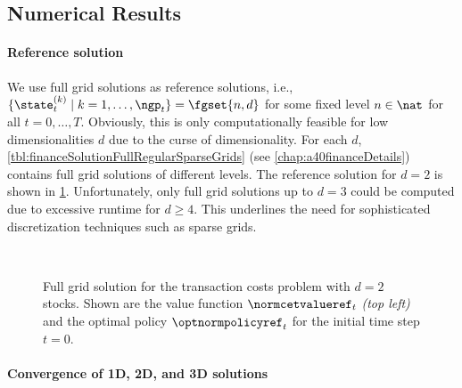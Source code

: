 \subsection{Numerical Results}
\label{sec:843results}

\paragraph{Reference solution}

We use full grid solutions as reference solutions,
i.e., $\{\state_t^{(k)} \mid k = 1, \dotsc, \ngp_t\} = \fgset{n,d}$
for some fixed level $n \in \nat$ for all $t = 0, \dotsc, T$.
Obviously, this is only computationally feasible
for low dimensionalities $d$ due to the curse of dimensionality.
For each $d$,
\cref{tbl:financeSolutionFullRegularSparseGrids}
(see \cref{chap:a40financeDetails})
contains full grid solutions of different levels.
The reference solution for $d = 2$ is shown in
\cref{fig:financeSolution2DReference}.
Unfortunately, only full grid solutions up to $d = 3$ could be computed
due to excessive runtime for $d \ge 4$.
This underlines the need for sophisticated
discretization techniques such as sparse grids.

\begin{figure}
  \hfill%
  \hfill%
  \\[1mm]%
  \hfill%
  \hfill%
  \caption[Reference solution for the two-dimensional TCP]{%
    Full grid solution for the transaction costs problem
    with $d = 2$ stocks.
    Shown are the value function $\normcetvalueref_t$ \emph{(top left)} and the
    optimal policy $\optnormpolicyref_t$ for the initial time step $t = 0$.%
  }%
  \label{fig:financeSolution2DReference}%
\end{figure}

\paragraph{Convergence of 1D, 2D, and 3D solutions}


